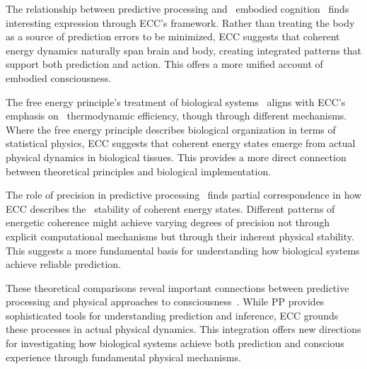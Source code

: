 The relationship between predictive processing and~ embodied cognition~\cite{Clark2016, Varela2017} finds interesting expression through ECC's framework. Rather than treating the body as a source of prediction errors to be minimized, ECC suggests that coherent energy dynamics naturally span brain and body, creating integrated patterns that support both prediction and action. This offers a more unified account of embodied consciousness.

The free energy principle's treatment of biological systems~\cite{Friston2010, Kirchhoff2018} aligns with ECC's emphasis on~ thermodynamic efficiency, though through different mechanisms. Where the free energy principle describes biological organization in terms of statistical physics, ECC suggests that coherent energy states emerge from actual physical dynamics in biological tissues. This provides a more direct connection between theoretical principles and biological implementation.

The role of precision in predictive processing~\cite{Hohwy2008, Seth2014} finds partial correspondence in how ECC describes the~ stability of coherent energy states. Different patterns of energetic coherence might achieve varying degrees of precision not through explicit computational mechanisms but through their inherent physical stability. This suggests a more fundamental basis for understanding how biological systems achieve reliable prediction.

These theoretical comparisons reveal important connections between predictive processing and physical approaches to consciousness~\cite{Seth2014, McFadden2020}. While PP provides sophisticated tools for understanding prediction and inference, ECC grounds these processes in actual physical dynamics. This integration offers new directions for investigating how biological systems achieve both prediction and conscious experience through fundamental physical mechanisms.

